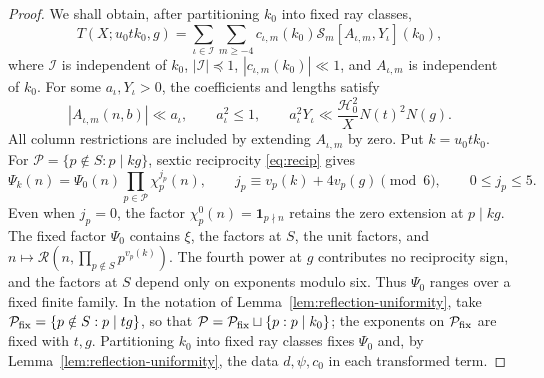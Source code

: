 \documentclass[11pt,a4paper]{article}
\numberwithin{equation}{section}
\numberwithin{figure}{section}
\theoremstyle{definition}
\theoremstyle{remark}
\newcommand{\ind}{\mathbf1}
\newcommand{\precbd}{\preccurlyeq}
\begin{document}
\begin{proof}
We shall obtain, after partitioning $k_0$ into fixed ray classes,
\[
 T(X;u_0tk_0,g)
 =\sum_{\iota\in\mathcal I}\sum_{m\ge-4}
 c_{\iota,m}(k_0)\mathscr S_m[A_{\iota,m},Y_\iota](k_0),
\]
where $\mathcal I$ is independent of $k_0$, $|\mathcal I|\precbd1$,
$|c_{\iota,m}(k_0)|\ll1$, and $A_{\iota,m}$ is independent of $k_0$.
For some $a_\iota,Y_\iota>0$, the coefficients and lengths satisfy
\begin{equation}\label{eq:auxiliary-conductor-bound}
 |A_{\iota,m}(n,b)|\ll a_\iota,\qquad
 a_\iota^2\le1,\qquad
 a_\iota^2Y_\iota\ll
 \frac{\mathcal H_0^2}{X}N(t)^2N(g).
\end{equation}
All column restrictions are included by extending $A_{\iota,m}$ by zero.
Put $k=u_0tk_0$. For $\mathcal P=\{p\notin S:p\mid kg\}$, sextic
reciprocity \eqref{eq:recip} gives
\begin{equation}\label{eq:theta-row-twist}
 \Psi_k(n)=\Psi_0(n)\prod_{p\in\mathcal P}\chi_p^{j_p}(n),
 \qquad j_p\equiv v_p(k)+4v_p(g)\pmod6,
 \qquad 0\le j_p\le5.
\end{equation}
Even when $j_p=0$, the factor $\chi_p^0(n)=\ind_{p\nmid n}$
retains the zero extension at $p\mid kg$. The fixed factor $\Psi_0$
contains $\xi$, the factors at $S$, the unit factors,
and $n\mapsto\mathcal R(n,\prod_{p\notin S}p^{v_p(k)})$.
The fourth power at $g$ contributes no reciprocity sign, and the
factors at $S$ depend only on exponents modulo six. Thus $\Psi_0$
ranges over a fixed finite family. In the notation of
Lemma~\ref{lem:reflection-uniformity}, take
$\mathcal P_{\rm fix}=\{p\notin S:p\mid tg\}$, so that
$\mathcal P=\mathcal P_{\rm fix}\sqcup\{p:p\mid k_0\}$;
the exponents on $\mathcal P_{\rm fix}$ are fixed with $t,g$.
Partitioning $k_0$ into fixed
ray classes fixes $\Psi_0$ and, by
Lemma~\ref{lem:reflection-uniformity},
the data $d,\psi,c_0$ in each transformed term.


\end{proof}
\end{document}

